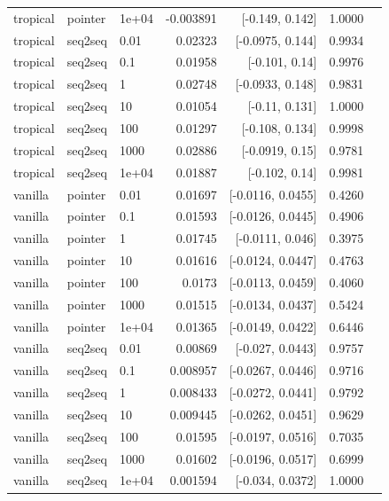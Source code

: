 \documentclass[10pt]{article}
\begin{document}
{\begin{longtable}{lllrrrl}
tropical & pointer & 1e+04 & -0.003891 & [-0.149, 0.142] & 1.0000 & \\
tropical & seq2seq & 0.01 & 0.02323 & [-0.0975, 0.144] & 0.9934 & \\
tropical & seq2seq & 0.1 & 0.01958 & [-0.101, 0.14] & 0.9976 & \\
tropical & seq2seq & 1 & 0.02748 & [-0.0933, 0.148] & 0.9831 & \\
tropical & seq2seq & 10 & 0.01054 & [-0.11, 0.131] & 1.0000 & \\
tropical & seq2seq & 100 & 0.01297 & [-0.108, 0.134] & 0.9998 & \\
tropical & seq2seq & 1000 & 0.02886 & [-0.0919, 0.15] & 0.9781 & \\
tropical & seq2seq & 1e+04 & 0.01887 & [-0.102, 0.14] & 0.9981 & \\
vanilla & pointer & 0.01 & 0.01697 & [-0.0116, 0.0455] & 0.4260 & \\
vanilla & pointer & 0.1 & 0.01593 & [-0.0126, 0.0445] & 0.4906 & \\
vanilla & pointer & 1 & 0.01745 & [-0.0111, 0.046] & 0.3975 & \\
vanilla & pointer & 10 & 0.01616 & [-0.0124, 0.0447] & 0.4763 & \\
vanilla & pointer & 100 & 0.0173 & [-0.0113, 0.0459] & 0.4060 & \\
vanilla & pointer & 1000 & 0.01515 & [-0.0134, 0.0437] & 0.5424 & \\
vanilla & pointer & 1e+04 & 0.01365 & [-0.0149, 0.0422] & 0.6446 & \\
vanilla & seq2seq & 0.01 & 0.00869 & [-0.027, 0.0443] & 0.9757 & \\
vanilla & seq2seq & 0.1 & 0.008957 & [-0.0267, 0.0446] & 0.9716 & \\
vanilla & seq2seq & 1 & 0.008433 & [-0.0272, 0.0441] & 0.9792 & \\
vanilla & seq2seq & 10 & 0.009445 & [-0.0262, 0.0451] & 0.9629 & \\
vanilla & seq2seq & 100 & 0.01595 & [-0.0197, 0.0516] & 0.7035 & \\
vanilla & seq2seq & 1000 & 0.01602 & [-0.0196, 0.0517] & 0.6999 & \\
vanilla & seq2seq & 1e+04 & 0.001594 & [-0.034, 0.0372] & 1.0000 & \\
\bottomrule
\end{longtable}
}
\end{document}
